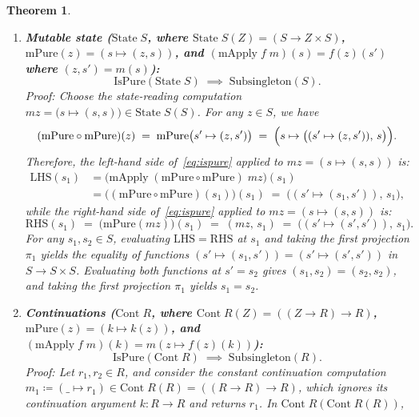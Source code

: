 \documentclass[11pt,a4paper]{article}
\newtheorem{theorem}{Theorem}[section]
\theoremstyle{definition}
\theoremstyle{remark}
\begin{document}
\begin{theorem}
\begin{enumerate}[label=(\arabic*),nosep]
  Taking the first projection $\pi_1$ of $\mathrm{LHS} = \mathrm{RHS}$ gives $(e, e) = (e, w)$, and
  taking the second projection $\pi_2$ gives $e = w$. Hence for any $w_1, w_2 \in W$, $w_1 = e = w_2$.
  \vspace{4pt}
  \item \textbf{Mutable state ($\mathrm{State}\;S$, where $\mathrm{State}\;S(Z) = (S \to Z \times S)$,
  $\mathrm{mPure}(z) = (s \mapsto (z, s))$, and
  $(\mathrm{mApply}\;f\;m)(s) = f(z)(s')$ where $(z, s') = m(s)$):}
  \[
    \mathrm{IsPure}(\mathrm{State}\;S) \;\implies\; \mathrm{Subsingleton}(S).
  \]
  \emph{Proof:} Choose the state-reading computation $mz = \bigl(s \mapsto (s, s)\bigr) \in \mathrm{State}\;S(S)$.
  For any $z \in S$, we have
  \[
    (\mathrm{mPure} \circ \mathrm{mPure})(z)
    \;=\; \mathrm{mPure}\bigl(s' \mapsto (z, s')\bigr)
    \;=\; \Bigl(s \mapsto \bigl((s' \mapsto (z, s')),\, s\bigr)\Bigr).
  \]
  Therefore, the left-hand side of~\eqref{eq:ispure} applied to $mz = (s \mapsto (s, s))$ is:
  \begin{align*}
    \mathrm{LHS}(s_1)
    &= \bigl(\mathrm{mApply}\;(\mathrm{mPure} \circ \mathrm{mPure})\;mz\bigr)(s_1) \\
    &= \bigl((\mathrm{mPure} \circ \mathrm{mPure})(s_1)\bigr)(s_1)
    \;=\; \bigl((s' \mapsto (s_1, s')),\, s_1\bigr),
  \end{align*}
  while the right-hand side of~\eqref{eq:ispure} applied to $mz = (s \mapsto (s, s))$ is:
  \[
    \mathrm{RHS}(s_1)
    \;=\; \bigl(\mathrm{mPure}(mz)\bigr)(s_1)
    \;=\; (mz,\, s_1)
    \;=\; \bigl((s' \mapsto (s', s')),\, s_1\bigr).
  \]
  For any $s_1, s_2 \in S$, evaluating $\mathrm{LHS} = \mathrm{RHS}$ at $s_1$ and taking the first
  projection $\pi_1$ yields the equality of functions $(s' \mapsto (s_1, s')) = (s' \mapsto (s', s'))$
  in $S \to S \times S$. Evaluating both functions at $s' = s_2$ gives $(s_1, s_2) = (s_2, s_2)$, and
  taking the first projection $\pi_1$ yields $s_1 = s_2$.
  \vspace{4pt}
  \item \textbf{Continuations ($\mathrm{Cont}\;R$, where $\mathrm{Cont}\;R(Z) = ((Z \to R) \to R)$,
  $\mathrm{mPure}(z) = (k \mapsto k(z))$, and
  $(\mathrm{mApply}\;f\;m)(k) = m(z \mapsto f(z)(k))$):}
  \[
    \mathrm{IsPure}(\mathrm{Cont}\;R) \;\implies\; \mathrm{Subsingleton}(R).
  \]
  \emph{Proof:} Let $r_1, r_2 \in R$, and consider the constant continuation computation
  $m_1 \coloneqq (\_ \mapsto r_1) \in \mathrm{Cont}\;R(R) = ((R \to R) \to R)$, which ignores its
  continuation argument $k : R \to R$ and returns $r_1$. In $\mathrm{Cont}\;R(\mathrm{Cont}\;R(R))$,

\end{enumerate}
\end{theorem}
\end{document}
